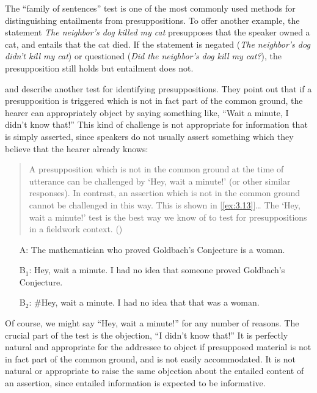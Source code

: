 The “family of sentences” test is one of the most commonly used methods for distinguishing entailments from presuppositions. To offer another example, the statement \textit{The neighbor’s dog killed my cat} presupposes that the speaker owned a cat, and entails that the cat died. If the statement is negated (\textit{The neighbor’s dog didn’t kill my cat}) or questioned (\textit{Did the neighbor’s dog kill my cat?}), the presupposition still holds but entailment does not.

 and  \citet{vonFintelMatthewson2008} describe another test for identifying presuppositions. They point out that if a presupposition is triggered which is not in fact part of the common ground, the hearer can appropriately object by saying something like, “Wait a minute, I didn’t know that!” This kind of challenge is not appropriate for information that is simply asserted, since speakers do not usually assert something which they believe that the hearer already knows:

\begin{quote}
A presupposition which is not in the common ground at the time of utterance can be challenged by ‘Hey, wait a minute!’ (or other similar responses). In contrast, an assertion which is not in the common ground cannot be challenged in this way. This is shown in [\ref{ex:3.13}]… The ‘Hey, wait a minute!’ test is the best way we know of to test for presuppositions in a fieldwork context. (\citealt{vonFintelMatthewson2008})
\end{quote}

\ea \label{ex:3.13}
\begin{itemize}
\item[A:] The mathematician who proved Goldbach’s Conjecture is a woman.\\
\item[B$_1$:] Hey, wait a minute. I had no idea that someone proved Goldbach’s Conjecture.\\
\item[B$_2$:] \#Hey, wait a minute. I had no idea that that was a woman.
\end{itemize}
\z

Of course, we might say ``Hey, wait a minute!'' for any number of reasons. The crucial part of the test is the objection, ``I didn’t know that!'' It is perfectly natural and appropriate for the addressee to object if presupposed material is not in fact part of the common ground, and is not easily accommodated. It is not natural or appropriate to raise the same objection about the entailed content of an assertion, since  entailed information is expected to be informative.


